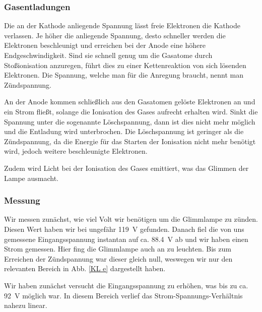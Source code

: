 \documentclass[11pt,a4paper,titlepage, ngerman]{article}
\begin{document}
			\subsubsection*{Gasentladungen}
			
				Die an der Kathode anliegende Spannung lässt freie Elektronen die Kathode verlassen.
				Je höher die anliegende Spannung, desto schneller werden die Elektronen beschleunigt und erreichen bei der Anode eine höhere Endgeschwindigkeit.
				Sind sie schnell genug um die Gasatome durch Stoßionisation anzuregen, führt dies zu einer Kettenreaktion von sich lösenden Elektronen.
				Die Spannung, welche man für die Anregung braucht, nennt man Zündspannung. 
				
				An der Anode kommen schließlich aus den Gasatomen gelöste Elektronen an und ein Strom fließt, solange die Ionisation des Gases aufrecht erhalten wird.
				Sinkt die Spannung unter die sogenannte Löschspannung, dann ist dies nicht mehr möglich und die Entladung wird unterbrochen.
				Die Löschspannung ist geringer als die Zündspannung, da die Energie für das Starten der Ionisation nicht mehr benötigt wird, jedoch weitere beschleunigte Elektronen.
					
				Zudem wird Licht bei der Ionisation des Gases emittiert, was das \glqq Glimmen\grqq{} der Lampe ausmacht.
			\subsubsection*{Messung}
			
				Wir messen zunächst, wie viel Volt wir benötigen um die Glimmlampe zu zünden.
				Diesen Wert haben wir bei ungefähr \SI{119}{\V} gefunden.
				Danach fiel die von uns gemessene Eingangsspannung instantan auf ca. \SI{88,4}{\V} ab und wir haben einen Strom gemessen.
				Hier fing die Glimmlampe auch an zu leuchten.
				Bis zum Erreichen der Zündspannung war dieser gleich null, weswegen wir nur den relevanten Bereich in Abb. \ref{KL e} dargestellt haben.
				
				Wir haben zunächst versucht die Eingangsspannung zu erhöhen, was bis zu ca. \SI{92}{\V} möglich war. In diesem Bereich verlief das Strom-Spannungs-Verhältnis nahezu linear.
				
\end{document}
